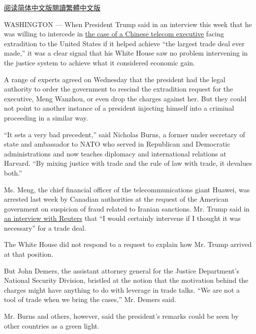\href{https://cn.nytimes.com/usa/20181214/trump-meng-wanzhou-huawei-extradition/}{阅读简体中文版}\href{https://cn.nytimes.com/usa/20181214/trump-meng-wanzhou-huawei-extradition/zh-hant/}{閱讀繁體中文版}

WASHINGTON --- When President Trump said in an interview this week that
he was willing to intercede in
\href{https://www.nytimes.com/2018/12/11/technology/huawei-executive-canada-bail-decision.html}{the
case of a Chinese telecom executive} facing extradition to the United
States if it helped achieve ``the largest trade deal ever made,'' it was
a clear signal that his White House saw no problem intervening in the
justice system to achieve what it considered economic gain.

A range of experts agreed on Wednesday that the president had the legal
authority to order the government to rescind the extradition request for
the executive, Meng Wanzhou, or even drop the charges against her. But
they could not point to another instance of a president injecting
himself into a criminal proceeding in a similar way.

``It sets a very bad precedent,'' said Nicholas Burns, a former under
secretary of state and ambassador to NATO who served in Republican and
Democratic administrations and now teaches diplomacy and international
relations at Harvard. ``By mixing justice with trade and the rule of law
with trade, it devalues both.''

Ms. Meng, the chief financial officer of the telecommunications giant
Huawei, was arrested last week by Canadian authorities at the request of
the American government on suspicion of fraud related to Iranian
sanctions. Mr. Trump said in
\href{https://www.reuters.com/article/us-usa-trump/trump-says-would-intervene-in-arrest-of-chinese-executive-idUSKBN1OB01P}{an
interview with Reuters} that ``I would certainly intervene if I thought
it was necessary'' for a trade deal.

The White House did not respond to a request to explain how Mr. Trump
arrived at that position.

But John Demers, the assistant attorney general for the Justice
Department's National Security Division, bristled at the notion that the
motivation behind the charges might have anything to do with leverage in
trade talks. ``We are not a tool of trade when we bring the cases,'' Mr.
Demers said.

Mr. Burns and others, however, said the president's remarks could be
seen by other countries as a green light.

